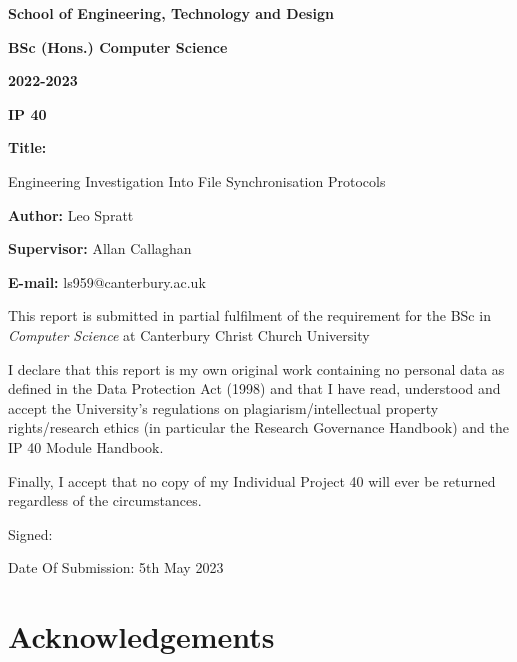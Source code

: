 \documentclass[a4paper,12pt]{report}
\begin{document}
\begin{titlepage}

	\begin{center}
		\textbf{School of Engineering, Technology and Design}

		\textbf{BSc (Hons.) Computer Science}

		\textbf{2022-2023}

		\textbf{IP 40}

		\vspace{4ex}

		\textbf{Title:}

		Engineering Investigation Into File Synchronisation Protocols

        \textbf{Author:} Leo Spratt

        \textbf{Supervisor:} Allan Callaghan

        \textbf{E-mail:} ls959@canterbury.ac.uk

		\vspace{4ex}

        \small{This report is submitted in partial fulfilment of the requirement for the BSc in \textsl{Computer Science} at Canterbury Christ Church University

		I declare that this report is my own original work containing no personal data as defined in the Data Protection Act (1998) and that I have read, understood and accept the University's regulations on plagiarism/intellectual property rights/research ethics (in particular the Research Governance Handbook) and the IP 40 Module Handbook.

        Finally, I accept that no copy of my Individual Project 40 will ever be returned regardless of the circumstances.}

		Signed: \verb|              |

		Date Of Submission: 5th May 2023
	\end{center}
\end{titlepage}


\begin{abstract}
	
\end{abstract}
\chapter*{Acknowledgements}

\tableofcontents
\newpage
\listoffigures
\newpage
\listoftables
\newpage
\lstlistoflistings
\newpage
\end{document}
